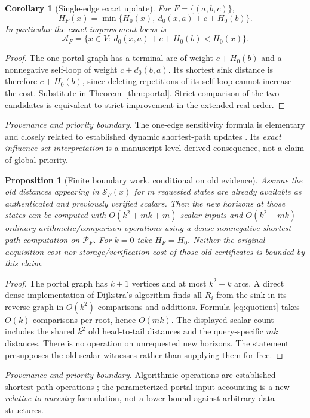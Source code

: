 \documentclass[11pt,letterpaper]{article}
\newtheorem{proposition}[theorem]{Proposition}
\newtheorem{corollary}[theorem]{Corollary}
\newcommand{\PP}{\mathcal P}
\newcommand{\attrib}[1]{\par\noindent\textit{Provenance and priority boundary.} #1\par}
\begin{document}
\begin{corollary}[Single-edge exact update]\label{cor:one}
For $F=\{(a,b,c)\}$,
\begin{equation}\label{eq:one}
\boxed{H_F(x)=\min\bigl\{H_0(x),\ d_0(x,a)+c+H_0(b)\bigr\}.}
\end{equation}
In particular the exact improvement locus is
\[
\mathcal A_F=\{x\in V:\ d_0(x,a)+c+H_0(b)<H_0(x)\}.
\]
\end{corollary}
\begin{proof}
The one-portal graph has a terminal arc of weight $c+H_0(b)$ and a nonnegative self-loop of weight $c+d_0(b,a)$. Its shortest sink distance is therefore $c+H_0(b)$, since deleting repetitions of its self-loop cannot increase the cost. Substitute in Theorem~\ref{thm:portal}. Strict comparison of the two candidates is equivalent to strict improvement in the extended-real order.
\end{proof}
\attrib{The one-edge sensitivity formula is elementary and closely related to established dynamic shortest-path updates \cite{Dynamic,Dstar,Demetrescu}. Its \emph{exact influence-set interpretation} is a manuscript-level derived consequence, not a claim of global priority.}

\begin{proposition}[Finite boundary work, conditional on old evidence]\label{prop:cost}
Assume the old distances appearing in $\mathcal S_F(x)$ for $m$ requested states are already available as authenticated and previously verified scalars. Then the new horizons at those states can be computed with $O(k^2+mk+m)$ scalar inputs and $O(k^2+mk)$ ordinary arithmetic/comparison operations using a dense nonnegative shortest-path computation on $\PP_F$. For $k=0$ take $H_F=H_0$. Neither the original acquisition cost nor storage/verification cost of those old certificates is bounded by this claim.
\end{proposition}
\begin{proof}
The portal graph has $k+1$ vertices and at most $k^2+k$ arcs. A direct dense implementation of Dijkstra's algorithm finds all $R_i$ from the sink in its reverse graph in $O(k^2)$ comparisons and additions. Formula \eqref{eq:quotient} takes $O(k)$ comparisons per root, hence $O(mk)$. The displayed scalar count includes the shared $k^2$ old head-to-tail distances and the query-specific $mk$ distances. There is no operation on unrequested new horizons. The statement presupposes the old scalar witnesses rather than supplying them for free.
\end{proof}
\attrib{Algorithmic operations are established shortest-path operations \cite{Dijkstra,Dynamic,Demetrescu}; the parameterized portal-input accounting is a new \emph{relative-to-ancestry} formulation, not a lower bound against arbitrary data structures.}
\end{document}
